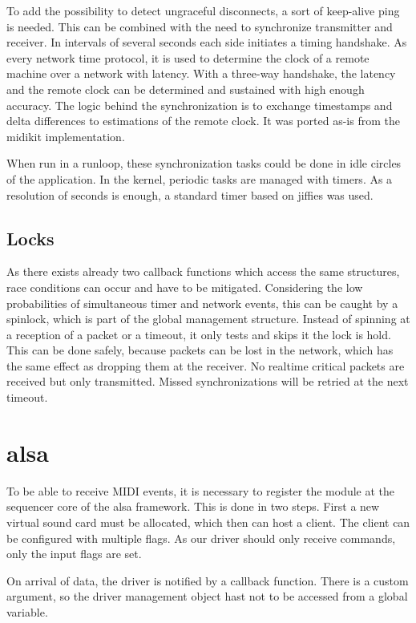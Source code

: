 \documentclass[paper=a4,fontsize=11pt,twocolumn,pagesize,bibtotoc]{scrartcl}
\begin{document}
	To add the possibility to detect ungraceful disconnects, a sort of keep-alive ping is needed. This can be combined with the need to synchronize transmitter and receiver. In intervals of several seconds each side initiates a timing handshake. As every network time protocol, it is used to determine the clock of a remote machine over a network with latency. With a three-way handshake, the latency and the remote clock can be determined and sustained with high enough accuracy.
	The logic behind the synchronization is to exchange timestamps and delta differences to estimations of the remote clock. It was ported as-is from the midikit implementation.
	
	When run in a runloop, these synchronization tasks could be done in idle circles of the application. In the kernel, periodic tasks are managed with timers. As a resolution of seconds is enough, a standard timer based on jiffies was used.
	
	\subsection{Locks}
	
	As there exists already two callback functions which access the same structures, race conditions can occur and have to be mitigated. Considering the low probabilities of simultaneous timer and network events, this can be caught by a spinlock, which is part of the global management structure. Instead of spinning at a reception of a packet or a timeout, it only tests and skips it the lock is hold. This can be done safely, because packets can be lost in the network, which has the same effect as dropping them at the receiver. No realtime critical packets are received but only transmitted. Missed synchronizations will be retried at the next timeout.  
	
	\section{alsa}
	
	To be able to receive MIDI events, it is necessary to register the module at the sequencer core of the alsa framework. This is done in two steps. First a new virtual sound card must be allocated, which then can host a client. The client can be configured with multiple flags. As our driver should only receive commands, only the input flags are set.
	
	On arrival of data, the driver is notified by a callback function. There is a custom argument, so the driver management object hast not to be accessed from a global variable.
	
\end{document}

